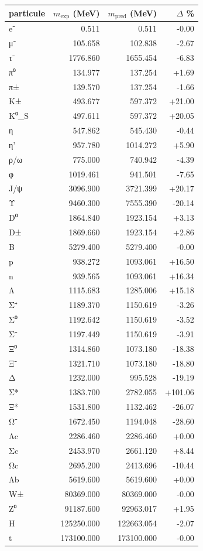 \begin{center}\small
\begin{tabular}{lrrr}
\toprule
particule & $m_{\text{exp}}$ (MeV) & $m_{\text{pred}}$ (MeV) & $\Delta$ \% \\
\midrule
  e⁻ & 0.511 & 0.511 & -0.00 \\
  μ⁻ & 105.658 & 102.838 & -2.67 \\
  τ⁻ & 1776.860 & 1655.454 & -6.83 \\
  π⁰ & 134.977 & 137.254 & +1.69 \\
  π± & 139.570 & 137.254 & -1.66 \\
  K± & 493.677 & 597.372 & +21.00 \\
  K⁰_S & 497.611 & 597.372 & +20.05 \\
  η & 547.862 & 545.430 & -0.44 \\
  η' & 957.780 & 1014.272 & +5.90 \\
  ρ/ω & 775.000 & 740.942 & -4.39 \\
  φ & 1019.461 & 941.501 & -7.65 \\
  J/ψ & 3096.900 & 3721.399 & +20.17 \\
  Υ & 9460.300 & 7555.390 & -20.14 \\
  D⁰ & 1864.840 & 1923.154 & +3.13 \\
  D± & 1869.660 & 1923.154 & +2.86 \\
  B & 5279.400 & 5279.400 & -0.00 \\
  p & 938.272 & 1093.061 & +16.50 \\
  n & 939.565 & 1093.061 & +16.34 \\
  Λ & 1115.683 & 1285.006 & +15.18 \\
  Σ⁺ & 1189.370 & 1150.619 & -3.26 \\
  Σ⁰ & 1192.642 & 1150.619 & -3.52 \\
  Σ⁻ & 1197.449 & 1150.619 & -3.91 \\
  Ξ⁰ & 1314.860 & 1073.180 & -18.38 \\
  Ξ⁻ & 1321.710 & 1073.180 & -18.80 \\
  Δ & 1232.000 & 995.528 & -19.19 \\
  Σ* & 1383.700 & 2782.055 & +101.06 \\
  Ξ* & 1531.800 & 1132.462 & -26.07 \\
  Ω⁻ & 1672.450 & 1194.048 & -28.60 \\
  Λc & 2286.460 & 2286.460 & +0.00 \\
  Σc & 2453.970 & 2661.120 & +8.44 \\
  Ωc & 2695.200 & 2413.696 & -10.44 \\
  Λb & 5619.600 & 5619.600 & +0.00 \\
  W± & 80369.000 & 80369.000 & -0.00 \\
  Z⁰ & 91187.600 & 92963.017 & +1.95 \\
  H & 125250.000 & 122663.054 & -2.07 \\
  t & 173100.000 & 173100.000 & -0.00 \\
\bottomrule
\end{tabular}
\end{center}

